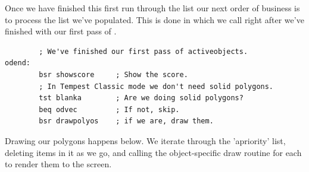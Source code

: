 Once we have finished this first run through the  list our next order of business
is to process the  list we've populated. This is done in  which we
call right after we've finished with our first pass of . 

\begin{lstlisting}
        ; We've finished our first pass of activeobjects.
odend:
        bsr showscore     ; Show the score.
        ; In Tempest Classic mode we don't need solid polygons.
        tst blanka        ; Are we doing solid polygons?
        beq odvec         ; If not, skip.
        bsr drawpolyos    ; if we are, draw them.
\end{lstlisting}

Drawing our polygons happens below. We iterate through the 'apriority' list, deleting items in it
as we go, and calling the object-specific draw routine for each to render them to the screen.

